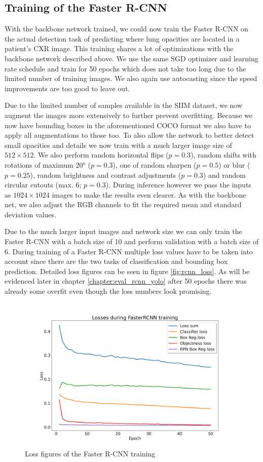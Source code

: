 \subsection*{Training of the Faster R-CNN}

With the backbone network trained, we could now train the Faster R-CNN on the actual detection task of predicting where lung opacities are located in a patient's \ac{CXR} image. This training shares a lot of optimizations with the backbone network described above. We use the same \ac{SGD} optimizer and learning rate schedule and train for 50 epochs which does not take too long due to the limited number of training images. We also again use autocasting since the speed improvements are too good to leave out.

Due to the limited number of samples available in the SIIM dataset, we now augment the images more extensively to further prevent overfitting. Because we now have bounding boxes in the aforementioned \ac{COCO} format we also have to apply all augmentations to those too. To also allow the network to better detect small opacities and details we now train with a much larger image size of $512 \times 512$. We also perform random horizontal flips ($p=0.3$), random shifts with rotations of maximum 20° ($p=0.3$), one of random sharpen ($p=0.5$) or blur ($p=0.25$), random brightness and contrast adjustments ($p=0.3$) and random circular cutouts (max. 6; $p=0.3$). During inference however we pass the inputs as $1024 \times 1024$ images to make the results even clearer. As with the backbone net, we also adjust the RGB channels to fit the required mean and standard deviation values.

Due to the much larger input images and network size we can only train the Faster R-CNN with a batch size of 10 and perform validation with a batch size of 6. During training of a Faster R-CNN multiple loss values have to be taken into account since there are the two tasks of classification and bounding box prediction. Detailed loss figures can be seen in figure \vref{fig:rcnn_loss}. As will be evidenced later in chapter \vref{chapter:eval_rcnn_yolo} after 50 epochs there was already some overfit even though the loss numbers look promising.

\begin{figure}
	\centering
	\includegraphics[width=.7\linewidth]{img/loss_fasterrcnn_50.png}
	\caption{Loss figures of the Faster R-CNN training}
	\label{fig:rcnn_loss}
\end{figure}

